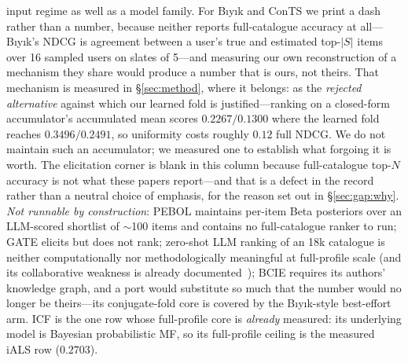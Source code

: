 \documentclass[11pt]{article}
\begin{document}
input regime as well as a model family. For B\i y\i k and ConTS we print a dash rather than a number, because neither reports full-catalogue accuracy at all---B\i y\i k's NDCG is agreement between a user's true and estimated top-$|S|$ items over 16 sampled users on slates of 5---and measuring our own reconstruction of a mechanism they share would produce a number that is ours, not theirs. That mechanism is measured in \S\ref{sec:method}, where it belongs: as the \emph{rejected alternative} against which our learned fold is justified---ranking on a closed-form accumulator's accumulated mean scores $0.2267/0.1300$ where the learned fold reaches $0.3496/0.2491$, so uniformity costs roughly $0.12$ full NDCG. We do not maintain such an accumulator; we measured one to establish what forgoing it is worth. The elicitation corner is blank in this column because full-catalogue top-$N$ accuracy is not what these papers report---and that is a defect in the record rather than a neutral choice of emphasis, for the reason set out in \S\ref{sec:gap:why}. \emph{Not runnable by construction}: PEBOL maintains per-item Beta posteriors over an LLM-scored shortlist of $\sim$100 items and contains no full-catalogue ranker to run; GATE elicits but does not rank; zero-shot LLM ranking of an 18k catalogue is neither computationally nor methodologically meaningful at full-profile scale (and its collaborative weakness is already documented~\cite{he2023large}); BCIE requires its authors' knowledge graph, and a port would substitute so much that the number would no longer be theirs---its conjugate-fold core is covered by the B\i y\i k-style best-effort arm. ICF is the one row whose full-profile core is \emph{already} measured: its underlying model is Bayesian probabilistic MF, so its full-profile ceiling is the measured iALS row ($0.2703$).
\end{document}
